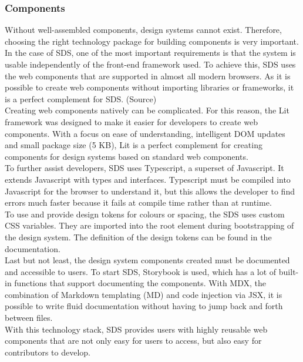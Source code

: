 \subsubsection*{Components}
Without well-assembled components, design systems cannot exist. Therefore, choosing the right technology package for building components is very important. 
In the case of SDS, one of the most important requirements is that the system is usable independently of the front-end framework used. To achieve this, SDS uses the web components that are supported in almost all modern browsers. As it is possible to create web components without importing libraries or frameworks, it is a perfect complement for SDS. (Source)\citep{component_definition} \\
Creating web components natively can be complicated. For this reason, the Lit framework was designed to make it easier for developers to create web components. With a focus on ease of understanding, intelligent DOM updates and small package size (5 KB), Lit is a perfect complement for creating components for design systems based on standard web components. \citep{component_definition} \\
To further assist developers, SDS uses Typescript, a superset of Javascript. It extends Javascript with types and interfaces. Typescript must be compiled into Javascript for the browser to understand it, but this allows the developer to find errors much faster because it fails at compile time rather than at runtime. \citep{component_definition} \\
To use and provide design tokens for colours or spacing, the SDS uses custom CSS variables. They are imported into the root element during bootstrapping of the design system. The definition of the design tokens can be found in the documentation. \citep{component_definition} \\
Last but not least, the design system components created must be documented and accessible to users. To start SDS, Storybook is used, which has a lot of built-in functions that support documenting the components. With MDX, the combination of Markdown templating (MD) and code injection via JSX, it is possible to write fluid documentation without having to jump back and forth between files. \citep{component_definition} \\
With this technology stack, SDS provides users with highly reusable web components that are not only easy for users to access, but also easy for contributors to develop. 
